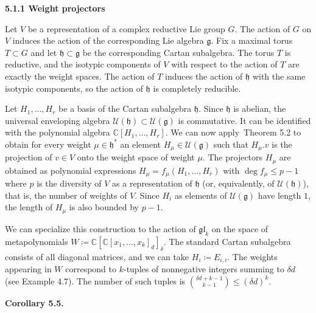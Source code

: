 \documentclass[10pt,a4paper]{article}
\begin{document}
\par\medskip\noindent\textbf{5.1.1 Weight projectors}\par




Let $V$ be a representation of a complex reductive Lie group $G$.
The action of $G$ on $V$ induces the action of the corresponding Lie algebra $\mathfrak{g}$.
Fix a maximal torus $T\subset G$ and let $\mathfrak{h}\subset\mathfrak{g}$ be the corresponding Cartan subalgebra.
The torus $T$ is reductive, and the isotypic components of $V$ with respect to the action of $T$ are exactly the weight spaces.
The action of $T$ induces the action of $\mathfrak{h}$ with the same isotypic components, so the action of $\mathfrak{h}$ is completely reducible.





Let $H_{1},\dots,H_{r}$ be a basis of the Cartan subalgebra $\mathfrak{h}$.
Since $\mathfrak{h}$ is abelian, the universal enveloping algebra $\mathcal{U}(\mathfrak{h})\subset\mathcal{U}(\mathfrak{g})$ is commutative.
It can be identified with the polynomial algebra $\mathbb{C}[H_{1},\dots,H_{r}]$.
We can now apply Theorem 5.2 to obtain for every weight $\mu\in\mathfrak{h}^{*}$ an element $H_{\mu}\in\mathcal{U}(\mathfrak{g})$ such that $H_{\mu}.v$ is the projection of $v\in V$ onto the weight space of weight $\mu$.
The projectors $H_{\mu}$ are obtained as polynomial expressions $H_{\mu}=f_{\mu}(H_{1},\dots,H_{r})$ with $\deg f_{\mu}\leq p-1$ where $p$ is the diversity of $V$ as a representation of $\mathfrak{h}$ (or, equivalently, of $\mathcal{U}(\mathfrak{h})$), that is, the number of weights of $V$.
Since $H_{i}$ as elements of $\mathcal{U}(\mathfrak{g})$ have length $1$, the length of $H_{\mu}$ is also bounded by $p-1$.





We can specialize this construction to the action of $\mathfrak{gl}_{k}$ on the space of metapolynomials $W\coloneqq\mathbb{C}[\mathbb{C}[x_{1},\ldots,x_{k}]_{d}]_{\delta}$.
The standard Cartan subalgebra consists of all diagonal matrices, and we can take $H_{i}\coloneqq E_{i,i}$.
The weights appearing in $W$ correspond to $k$-tuples of nonnegative integers summing to $\delta d$ (see Example 4.7). The number of such tuples is $\binom{\delta d+k-1}{k-1}\leq(\delta d)^{k}$.





\par\medskip\noindent\textbf{Corollary 5.5.}\par
\end{document}
